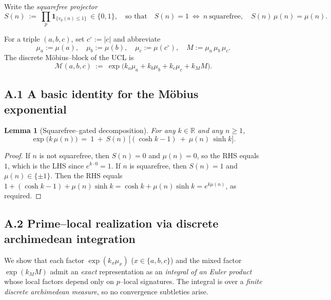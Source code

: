 \documentclass[12pt]{article}
\newtheorem{lemma}[theorem]{Lemma}
\numberwithin{equation}{section}
\begin{document}
Write the \emph{squarefree projector}
\[
S(n)\ :=\ \prod_{p}\mathbf{1}_{\{v_p(n)\le 1\}}\ \in\{0,1\},\quad
\text{so that}\quad S(n)=1\ \Leftrightarrow\ n\ \text{squarefree},\quad
S(n)\,\mu(n)=\mu(n).
\]

For a triple $(a,b,c)$, set $c^\circ:=|c|$ and abbreviate
\[
\mu_a:=\mu(a),\quad \mu_b:=\mu(b),\quad \mu_c:=\mu(c^\circ),\quad
M:=\mu_a\,\mu_b\,\mu_c.
\]
The discrete Möbius–block of the UCL is
\[
\mathcal{M}(a,b,c)\ :=\ \exp\!\big(k_a\mu_a + k_b\mu_b + k_c\mu_c + k_M M\big).
\]

\bigskip
\subsection*{A.1 \; A basic identity for the Möbius exponential}

\begin{lemma}[Squarefree–gated decomposition]\label{lem:gated}
For any $k\in\mathbb{R}$ and any $n\ge 1$,
\[
\exp\!\big(k\,\mu(n)\big)\ =\ 1\ +\ S(n)\,\Big[(\cosh k - 1) \ +\ \mu(n)\,\sinh k\Big].
\]
\end{lemma}

\begin{proof}
If $n$ is not squarefree, then $S(n)=0$ and $\mu(n)=0$, so the RHS equals $1$, which is the LHS since $e^{k\cdot 0}=1$.
If $n$ is squarefree, then $S(n)=1$ and $\mu(n)\in\{\pm 1\}$. Then the RHS equals
$1 + (\cosh k-1) + \mu(n)\sinh k = \cosh k + \mu(n)\sinh k = e^{k\mu(n)}$, as required.
\end{proof}

\bigskip
\subsection*{A.2 \; Prime–local realization via discrete archimedean integration}

We show that each factor $\exp(k_x\mu_x)$ ($x\in\{a,b,c\}$) and the mixed factor $\exp(k_M M)$ admit an \emph{exact} representation as an \emph{integral of an Euler product} whose local factors depend only on $p$–local signatures. The integral is over a \emph{finite discrete archimedean measure}, so no convergence subtleties arise.
\end{document}
